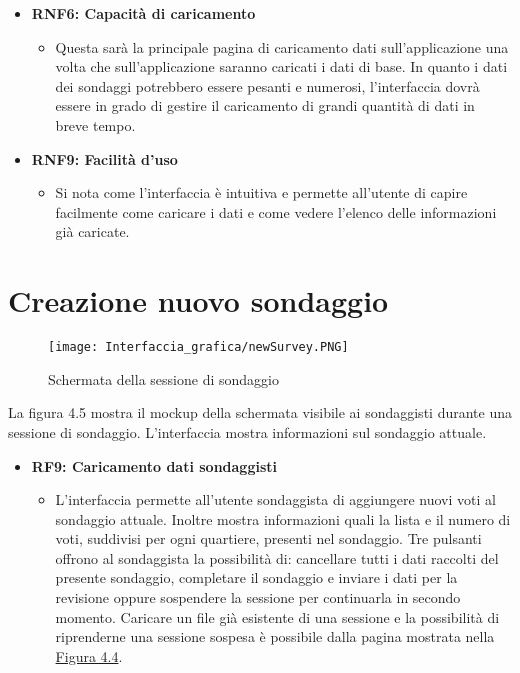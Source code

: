 \begin{itemize}
\begin{itemize}
        \end{itemize} 
        \item \textbf{RNF6: Capacità di caricamento} \begin{itemize}
            \item Questa sarà la principale pagina di caricamento dati sull'applicazione una volta che sull'applicazione saranno caricati i dati di base. In quanto i dati dei sondaggi potrebbero essere pesanti e numerosi, l'interfaccia dovrà essere in grado di gestire il caricamento di grandi quantità di dati in breve tempo.
        \end{itemize}
        \item \textbf{RNF9: Facilità d’uso} \begin{itemize}
            \item Si nota come l'interfaccia è intuitiva e permette all'utente di capire facilmente come caricare i dati e come vedere l'elenco delle informazioni già caricate.
        \end{itemize}
    \end{itemize}




\section{Creazione nuovo sondaggio}

    \begin{figure}[H]
        \center
        \texttt{[image: Interfaccia\_grafica/newSurvey.PNG]}
        \caption{Schermata della sessione di sondaggio}
    \end{figure}

    La figura 4.5 mostra il mockup della schermata visibile ai sondaggisti durante una sessione di sondaggio. L'interfaccia mostra informazioni sul sondaggio attuale.

    \begin{itemize}
        \item \textbf{RF9: Caricamento dati sondaggisti} \begin{itemize}
            \item L'interfaccia permette all'utente sondaggista di aggiungere nuovi voti al sondaggio attuale. Inoltre mostra informazioni quali la lista e il numero di voti, suddivisi per ogni quartiere, presenti nel sondaggio. Tre pulsanti offrono al sondaggista la possibilità di: cancellare tutti i dati raccolti del presente sondaggio, completare il sondaggio e inviare i dati per la revisione oppure sospendere la sessione per continuarla in secondo momento. Caricare un file già esistente di una sessione e la possibilità di riprenderne una sessione sospesa è possibile dalla pagina mostrata nella \hyperref[fig:4.4]{Figura 4.4}.
        \end{itemize}
    \end{itemize}
    